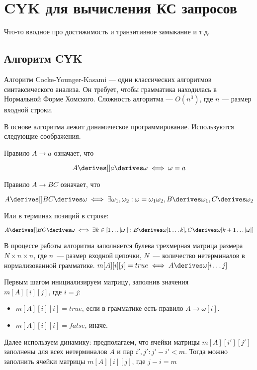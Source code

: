 \section{CYK для вычисления КС запросов}

Что-то вводное про достижимость и транзитивное замыкание и т.д.

\subsection{Алгоритм CYK}

Алгоритм Cocke-Younger-Kasami --- один классических алгоритмов синтаксического анализа. 
Он требует, чтобы грамматика находилась в Нормальной Форме Хомского. 
Сложность алгоритма --- $O(n^3)$, где $n$ --- размер входной строки. 

В основе алгоритма лежит динамическое программирование. 
Используются следующие соображения. 

Правило $A \to a$ означает, что 

\[
  A \derives[] a \derives \omega \iff \omega = a\]
  
Правило $A \to B C$ означает, что 

\[A \derives[] B C \derives \omega \iff \exists \omega_1, \omega_2 : \omega = \omega_1 \omega_2, B \derives \omega_1, C \derives \omega_2\]

Или в терминах позиций в строке: 

\[A \derives[] B C \derives \omega \iff \exists k \in [1 \dots |\omega|] : B \derives \omega[1 \dots k], C \derives \omega[k+1 \dots |\omega|]\]

В процессе работы алгоритма заполняется булева трехмерная матрица размера $N \times n \times n$, где $n$~---  размер входной цепочки, $N$~--- количество нетерминалов в нормализованной грамматике. 
$m[A][i][j] = true \iff A \derives \omega[i \dots j]$

Первым шагом инициализируем матрицу, заполнив значения $m[A][i][j] \text{, где }i = j$: 

\begin{itemize}
  \item $m[A][i][i] = true \text{, если в грамматике есть правило } A \to \omega[i]$.
  \item $m[A][i][i] = false$, иначе.
\end{itemize}

Далее используем динамику: предполагаем, что ячейки матрицы $m[A][i'][j']$ заполнены для всех нетерминалов $A$ и пар $i', j': j' - i' < m$.
Тогда можно заполнить ячейки матрицы $m[A][i][j] \text{, где } j - i = m$

